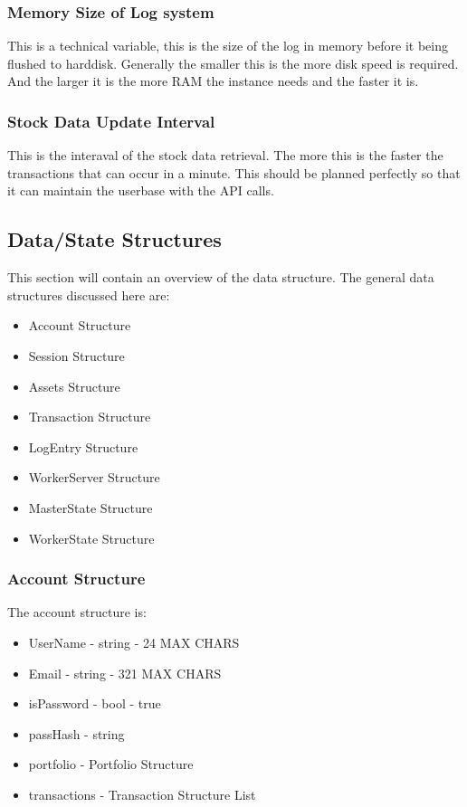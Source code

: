 \documentclass[a4paper]{article}
\begin{document}
\subsubsection{Memory Size of Log system}
\label{var_log_size}
This is a technical variable, this is the size of the log in memory before it 
being flushed to harddisk. Generally the smaller this is the more disk speed is
required. And the larger it is the more RAM the instance needs and the faster 
it is.
\subsubsection{Stock Data Update Interval}
\label{var_data_update_interval}
This is the interaval of the stock data retrieval. The more this is the faster
the transactions that can occur in a minute. This should be planned perfectly
so that it can maintain the userbase with the API calls.

\subsection{Data/State Structures}
\label{ds_list}
This section will contain an overview of the data structure. The general data
structures discussed here are:
\begin{itemize}
	\item Account Structure
	\item Session Structure
	\item Assets Structure
	\item Transaction Structure
	\item LogEntry Structure
	\item WorkerServer Structure
	\item MasterState Structure
	\item WorkerState Structure
\end{itemize}

\subsubsection{Account Structure}
\label{ds_account}
The account structure is:
\begin{itemize}
	\item UserName - string - 24 MAX CHARS
	\item Email - string - 321 MAX CHARS
	\item isPassword - bool - true
	\item passHash - string
	\item portfolio - Portfolio Structure
	\item transactions - Transaction Structure List
\end{itemize}
\end{document}
